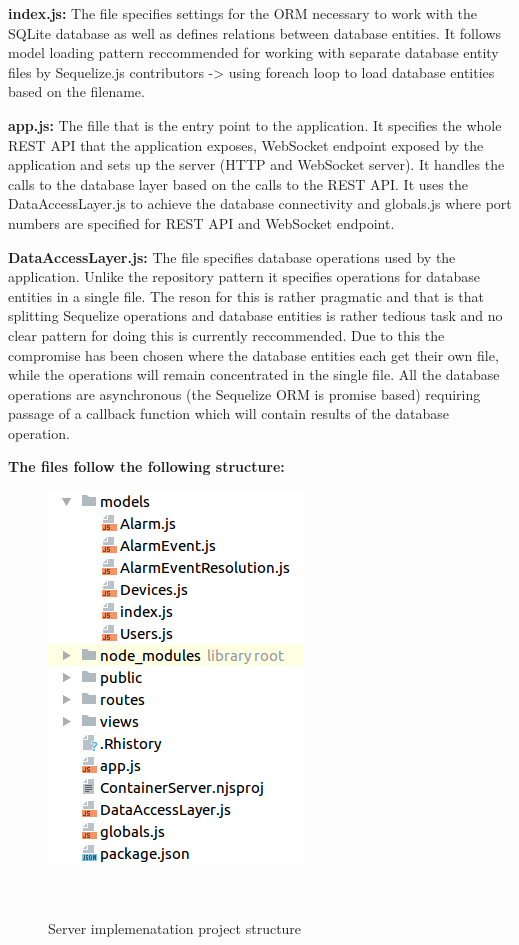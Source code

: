 \textbf{index.js:} \newline
The file specifies settings for the ORM necessary to work with the SQLite database as well as defines relations between database entities. It follows model loading pattern reccommended for working with separate database entity files by Sequelize.js contributors -> using foreach loop to load database entities based on the filename.

\smallskip
\textbf{app.js:} \newline
The fille that is the entry point to the application. It specifies the whole REST API that the application exposes, WebSocket endpoint exposed by the application and sets up the server (HTTP and WebSocket server). It handles the calls to the database layer based on the calls to the REST API. It uses the DataAccessLayer.js to achieve the database connectivity and globals.js where port numbers are specified for REST API and WebSocket endpoint.

\smallskip
\textbf{DataAccessLayer.js:} \newline
The file specifies database operations used by the application. Unlike the repository pattern it specifies operations for database entities in a single file. The reson for this is rather pragmatic and that is that splitting Sequelize operations and database entities is rather tedious task and no clear pattern for doing this is currently reccommended. Due to this the compromise has been chosen where the database entities each get their own file, while the operations will remain concentrated in the single file. All the database operations are asynchronous (the Sequelize ORM is promise based) requiring passage of a callback function which will contain results of the database operation.


\bigskip
\textbf{The files follow the following structure:}
\smallskip

\begin{figure}[H]
\includegraphics[scale=0.6]{gfx/structure}
\caption{Server implemenatation project structure}~\label{fig:structure}
\end{figure}
\smallskip


